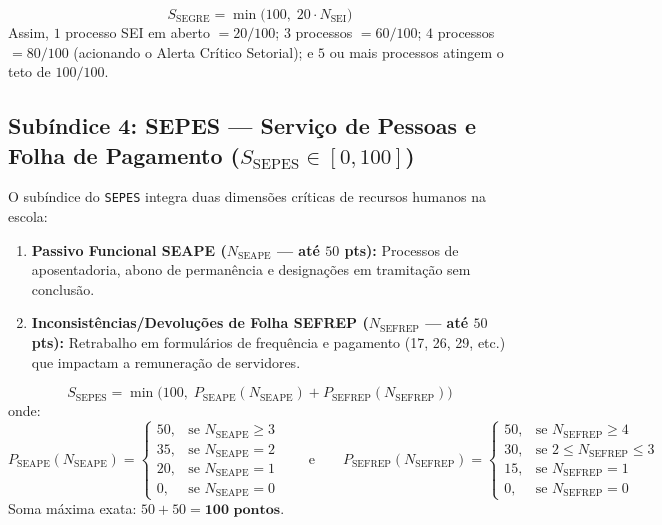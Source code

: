 \documentclass[9pt,a4paper]{extarticle}
\begin{document}
\begin{equation}
S_{\text{SEGRE}} = \min\big(100, \; 20 \cdot N_{\text{SEI}}\big)
\end{equation}
Assim, $1$ processo SEI em aberto $= 20/100$; $3$ processos $= 60/100$; $4$ processos $= 80/100$ (acionando o Alerta Crítico Setorial); e $5$ ou mais processos atingem o teto de $100/100$.

\subsection{Subíndice 4: SEPES --- Serviço de Pessoas e Folha de Pagamento ($S_{\text{SEPES}} \in [0, 100]$)}

O subíndice do \texttt{SEPES} integra duas dimensões críticas de recursos humanos na escola:
\begin{enumerate}[leftmargin=1.5em, itemsep=1pt]
    \item \textbf{Passivo Funcional SEAPE ($N_{\text{SEAPE}}$ --- até $50$ pts):} Processos de aposentadoria, abono de permanência e designações em tramitação sem conclusão.
    \item \textbf{Inconsistências/Devoluções de Folha SEFREP ($N_{\text{SEFREP}}$ --- até $50$ pts):} Retrabalho em formulários de frequência e pagamento (17, 26, 29, etc.) que impactam a remuneração de servidores.
\end{enumerate}

\begin{equation}
S_{\text{SEPES}} = \min\Big(100, \; P_{\text{SEAPE}}(N_{\text{SEAPE}}) + P_{\text{SEFREP}}(N_{\text{SEFREP}})\Big)
\end{equation}
onde:
\begin{equation}
P_{\text{SEAPE}}(N_{\text{SEAPE}}) = \begin{cases} 50, & \text{se } N_{\text{SEAPE}} \ge 3 \\ 35, & \text{se } N_{\text{SEAPE}} = 2 \\ 20, & \text{se } N_{\text{SEAPE}} = 1 \\ 0, & \text{se } N_{\text{SEAPE}} = 0 \end{cases}
\qquad \text{e} \qquad
P_{\text{SEFREP}}(N_{\text{SEFREP}}) = \begin{cases} 50, & \text{se } N_{\text{SEFREP}} \ge 4 \\ 30, & \text{se } 2 \le N_{\text{SEFREP}} \le 3 \\ 15, & \text{se } N_{\text{SEFREP}} = 1 \\ 0, & \text{se } N_{\text{SEFREP}} = 0 \end{cases}
\end{equation}
Soma máxima exata: $50 + 50 = \mathbf{100\text{ pontos}}$.
\end{document}
